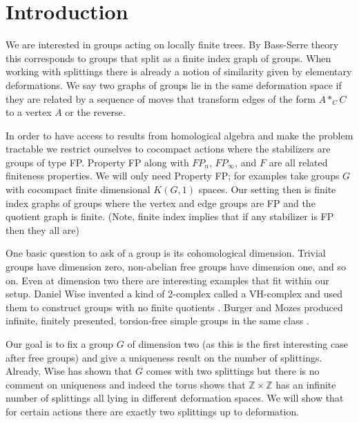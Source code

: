 \documentclass[12pt,parskip=full]{report}
\theoremstyle{plain}
\theoremstyle{definition}
\begin{document}


\chapter{Introduction}

We are interested in groups acting on locally finite trees. By Bass-Serre theory this corresponds to groups that split as a finite index graph of groups. When working with splittings there is already a notion of similarity given by elementary deformations. We say two graphs of groups lie in the same deformation space if they are related by a sequence of moves that transform edges of the form \(A*_CC\) to a vertex \(A\) or the reverse.

In order to have access to results from homological algebra and make the problem tractable we restrict ourselves to cocompact actions where the stabilizers are groups of type FP. Property FP along with \(FP_n\), \(FP_\infty\), and \(F\) are all related finiteness properties. We will only need Property FP; for examples take groups \(G\) with cocompact finite dimensional \(K(G,1)\) spaces. Our setting then is finite index graphs of groups where the vertex and edge groups are FP and the quotient graph is finite. (Note, finite index implies that if any stabilizer is FP then they all are)

One basic question to ask of a group is its cohomological dimension. Trivial groups have dimension zero, non-abelian free groups have dimension one, and so on. Even at dimension two there are interesting examples that fit within our setup. Daniel Wise invented a kind of 2-complex called a VH-complex and used them to construct groups with no finite quotients \cite{wisethesis}. Burger and Mozes produced infinite, finitely presented, torsion-free simple groups in the same class \cite{burgermozes}.

Our goal is to fix a group \(G\) of dimension two (as this is the first interesting case after free groups) and give a uniqueness result on the number of splittings. Already, Wise has shown that \(G\) comes with two splittings but there is no comment on uniqueness and indeed the torus shows that \(\mathbb{Z}\times\mathbb{Z}\) has an infinite number of splittings all lying in different deformation spaces. We will show that for certain actions there are exactly two splittings up to deformation.
\end{document}
